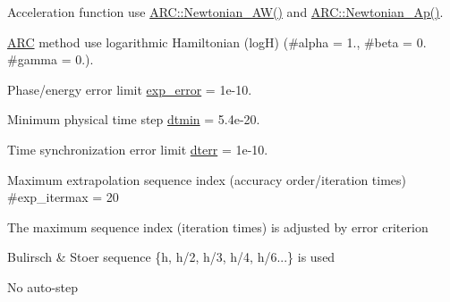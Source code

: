 \begin{DoxyItemize}
\item Acceleration function use \hyperlink{namespaceNTA_aecd205ef07c4302cd04d04218c4426e6}{A\+R\+C\+::\+Newtonian\+\_\+\+A\+W()} and \hyperlink{namespaceNTA_a5596f8660861d6e23c0827e381908641}{A\+R\+C\+::\+Newtonian\+\_\+\+Ap()}.
\item \hyperlink{namespaceARC}{A\+RC} method use logarithmic Hamiltonian (logH) (\#alpha = 1., \#beta = 0. \#gamma = 0.).
\item Phase/energy error limit \hyperlink{classARC_1_1chainpars_acd51cb7131052b15b230c235e4647360}{exp\+\_\+error} = 1e-\/10.
\item Minimum physical time step \hyperlink{classARC_1_1chainpars_a11a8ecf973a455e4b90ad6cdda49b3e0}{dtmin} = 5.\+4e-\/20.
\item Time synchronization error limit \hyperlink{classARC_1_1chainpars_a6824d23b1d73f10512d851219fedf744}{dterr} = 1e-\/10.
\item Maximum extrapolation sequence index (accuracy order/iteration times) \#exp\+\_\+itermax = 20
\item The maximum sequence index (iteration times) is adjusted by error criterion
\item Bulirsch \& Stoer sequence \{h, h/2, h/3, h/4, h/6...\} is used
\item No auto-\/step 
\end{DoxyItemize}\hypertarget{classARC_1_1chainpars_a95a143e04a37f662632330135842f1a6}{}\label{classARC_1_1chainpars_a95a143e04a37f662632330135842f1a6} 
